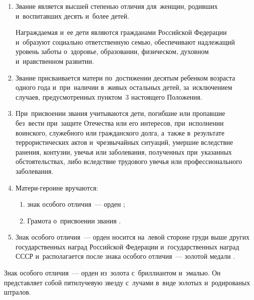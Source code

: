 \documentclass{../president-decree}
\providecommand*{\asbuk}{}
\begin{document}
	\begin{enumerate}
		\sloppy \item Звание  является высшей степенью отличия для~женщин, родивших и~воспитавших десять и~более детей.
		
		Награждаемая и~ее дети являются гражданами Российской Федерации и~образуют социально ответственную семью, обеспечивают надлежащий уровень заботы о~здоровье, образовании, физическом, духовном и~нравственном развитии.
		
		\item Звание  присваивается матери по~достижении десятым ребенком возраста одного года и~при~наличии в~живых остальных детей, за~исключением случаев, предусмотренных пунктом~3 настоящего Положения.
		
		\item При~присвоении звания  учитываются дети, погибшие или пропавшие без~вести при~защите Отечества или его интересов, при~исполнении воинского, служебного или гражданского долга, а~также в~результате террористических актов и~чрезвычайных ситуаций, умершие вследствие ранения, контузии, увечья или заболевания, полученных при~указанных обстоятельствах, либо вследствие трудового увечья или профессионального заболевания.
		
		\item Матери-героине вручаются:
		\begin{enumerate}[label=\asbuk*), ref=\asbuk*]
			\item знак особого отличия~--- орден ;
			
			\item Грамота о~присвоении звания .
		\end{enumerate}
	
		\item Знак особого отличия~--- орден  носится на~левой стороне груди выше других государственных наград Российской Федерации и~государственных наград СССР и~располагается после знака особого отличия~--- золотой медали .
	\end{enumerate}
\eaddition


	
	Знак особого отличия~--- орден  из~золота с~бриллиантом и~эмалью. Он представляет собой пятилучевую звезду с~лучами в~виде золотых и~родированых штралов.
	
\end{document}
